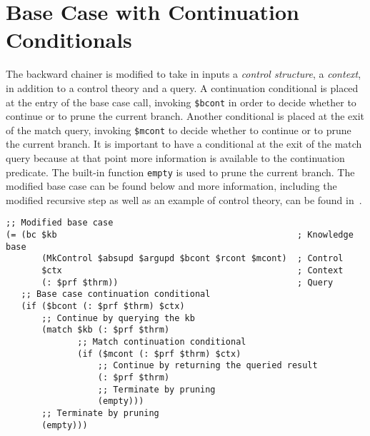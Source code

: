 \documentclass{easychair}
\begin{document}
\section{Base Case with Continuation Conditionals}
\label{app:backward-chainer-continuation-conditionals}

The backward chainer is modified to take in inputs a \emph{control
structure}, a \emph{context}, in addition to a control theory and a
query.  A continuation conditional is placed at the entry of the base
case call, invoking \texttt{\$bcont} in order to decide whether to
continue or to prune the current branch.  Another conditional is
placed at the exit of the match query, invoking \texttt{\$mcont} to
decide whether to continue or to prune the current branch.  It is
important to have a conditional at the exit of the match query because
at that point more information is available to the continuation
predicate.  The built-in function \texttt{empty} is used to prune the
current branch.  The modified base case can be found below and more
information, including the modified recursive step as well as an
example of control theory, can be found in~\cite{Geisweiller2024ICM}.
\small{
\begin{verbatim}
;; Modified base case
(= (bc $kb                                               ; Knowledge base
       (MkControl $absupd $argupd $bcont $rcont $mcont)  ; Control
       $ctx                                              ; Context
       (: $prf $thrm))                                   ; Query
   ;; Base case continuation conditional
   (if ($bcont (: $prf $thrm) $ctx)
       ;; Continue by querying the kb
       (match $kb (: $prf $thrm)
              ;; Match continuation conditional
              (if ($mcont (: $prf $thrm) $ctx)
                  ;; Continue by returning the queried result
                  (: $prf $thrm)
                  ;; Terminate by pruning
                  (empty)))
       ;; Terminate by pruning
       (empty)))
\end{verbatim}
}

\end{document}
